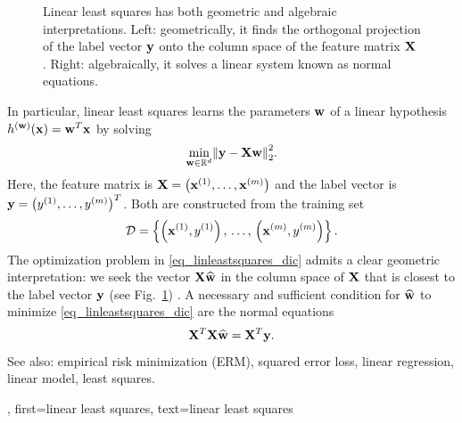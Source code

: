 {{{\begin{figure}
 \caption{Linear least squares has both geometric and algebraic interpretations. 
 Left: geometrically, it finds the orthogonal projection of the 
 label vector ${\bf y}$ onto the column space of the 
 feature matrix ${\bf X}$ \cite[Ch. 8]{BoydConvexBook}. Right: algebraically, it solves a linear system 
 known as normal equations. 
 \label{fig_linleastsquares_dict}}
 \end{figure}
 In particular, linear least squares learns the parameters ${\bf w}$ of a 
  linear hypothesis 
  $h^{({\bf w})}({\bf x}) = {\bf w}^{T} {\bf x}$ by solving 
  \begin{equation} 
 	\label{eq_linleastsquares_dic}
 	\min_{{\bf w} \in \mathbb{R}^{d}} \mleft\lVert {\bf y} - {\bf X} {\bf w} \mright\rVert_{2}^2.
  \end{equation} 
  Here, the feature matrix is 
  ${\bf X} = \big({\bf x}^{(1)},\ldots,{\bf x}^{(m)}\big)$ 
  and the label vector is 
  ${\bf y}= \big(y^{(1)},\ldots,y^{(m)}\big)^{T}$. 
  Both are constructed from the training set
  $$\mathcal{D} = \left\{ \left( {\bf x}^{(1)},y^{(1)} \right), \,\ldots, \,
 			   \left( {\bf x}^{(m)},y^{(m)} \right) \right\}.$$ 
  The optimization problem in \eqref{eq_linleastsquares_dic} admits a clear 
  geometric interpretation: we seek the vector ${\bf X} \widehat{{\bf w}}$ in the 
  column space of ${\bf X}$ that is closest to the label vector ${\bf y}$ 
  (see Fig.~\ref{fig_linleastsquares_dict}) \cite[Ch. 8]{BoydConvexBook}. 
  A necessary and sufficient condition for $\widehat{{\bf w}}$ to minimize 
  \eqref{eq_linleastsquares_dic} are the normal equations 
  $$ {\bf X}^{T} {\bf X} \widehat{{\bf w}} = {\bf X}^{T} {\bf y}. $$
		See also: empirical risk minimization (ERM), squared error loss, linear regression, linear model, least squares.},
	first={linear least squares},
	text={linear least squares}
}

}
